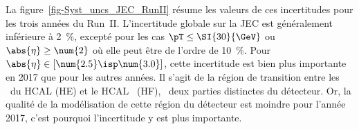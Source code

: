 La figure~\ref{fig-Syst_uncs_JEC_RunII} résume les valeurs de ces incertitudes pour les trois années du Run~II.
L'incertitude globale sur la JEC est généralement inférieure à \SI{2}{\%}, excepté pour les cas $\pT\leq\SI{30}{\GeV}$ ou $\abs{\eta}\geq\num{2}$ où elle peut être de l'ordre de \SI{10}{\%}.
Pour $\abs{\eta}\in[\num{2.5}\isp\num{3.0}]$, cette incertitude est bien plus importante en 2017 que pour les autres années. Il s'agit de la région de transition entre les \CMSendcaps\ du HCAL (HE) et le HCAL \CMSforward\ (HF), \ie\ deux parties distinctes du détecteur.
Or, la qualité de la modélisation de cette région du détecteur est moindre pour l'année 2017, c'est pourquoi l'incertitude y est plus importante.
